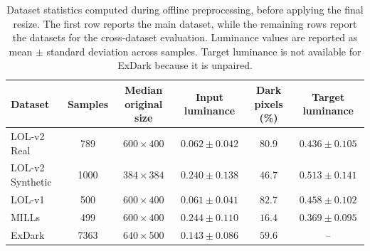 \begin{table}[t]
	\centering
	\caption{Dataset statistics computed during offline preprocessing, before applying the final resize. The first row reports the main dataset, while the remaining rows report the datasets for the cross-dataset evaluation. Luminance values are reported as mean $\pm$ standard deviation across samples. Target luminance is not available for ExDark because it is unpaired.}
	\label{tab:dataset_statistics}
	\begin{tabular}{lccccc}
		\toprule
		Dataset & Samples & Median original size & Input luminance & Dark pixels (\%) & Target luminance \\
		\midrule
		LOL-v2 Real & 789 & $600 \times 400$ & $0.062 \pm 0.042$ & $80.9$ & $0.436 \pm 0.105$ \\
		\midrule
		LOL-v2 Synthetic & 1000 & $384 \times 384$ & $0.240 \pm 0.138$ & $46.7$ & $0.513 \pm 0.141$ \\
		LOL-v1 & 500 & $600 \times 400$ & $0.061 \pm 0.041$ & $82.7$ & $0.458 \pm 0.102$ \\
		MILLs & 499 & $600 \times 400$ & $0.244 \pm 0.110$ & $16.4$ & $0.369 \pm 0.095$ \\
		ExDark & 7363 & $640 \times 500$ & $0.143 \pm 0.086$ & $59.6$ & -- \\
		\bottomrule
	\end{tabular}
\end{table}